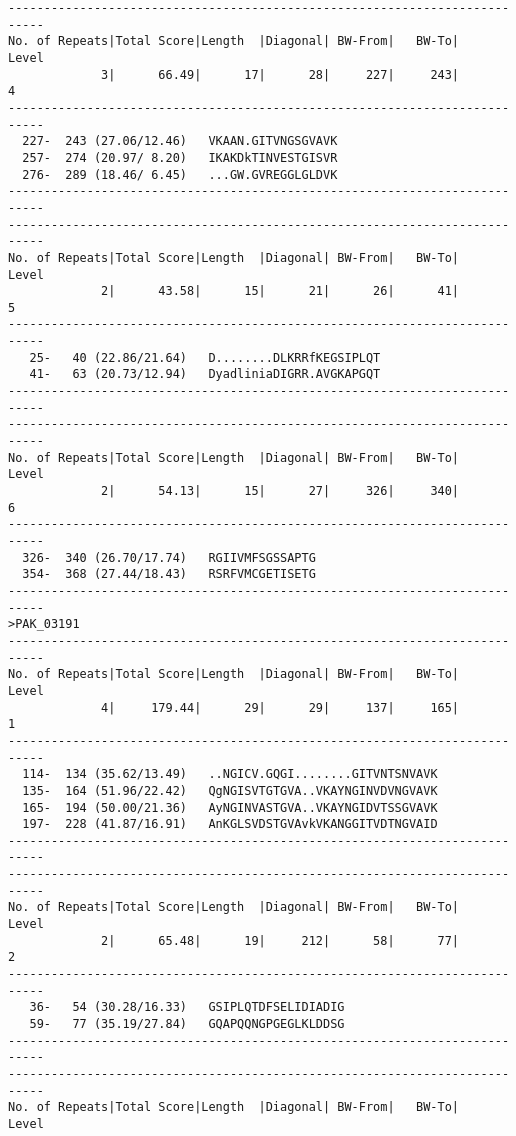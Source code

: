 \begin{verbatim}
---------------------------------------------------------------------------
No. of Repeats|Total Score|Length  |Diagonal| BW-From|   BW-To|   Level
             3|      66.49|      17|      28|     227|     243|       4
---------------------------------------------------------------------------
  227-  243 (27.06/12.46)	VKAAN.GITVNGSGVAVK
  257-  274 (20.97/ 8.20)	IKAKDkTINVESTGISVR
  276-  289 (18.46/ 6.45)	...GW.GVREGGLGLDVK
---------------------------------------------------------------------------
---------------------------------------------------------------------------
No. of Repeats|Total Score|Length  |Diagonal| BW-From|   BW-To|   Level
             2|      43.58|      15|      21|      26|      41|       5
---------------------------------------------------------------------------
   25-   40 (22.86/21.64)	D........DLKRRfKEGSIPLQT
   41-   63 (20.73/12.94)	DyadliniaDIGRR.AVGKAPGQT
---------------------------------------------------------------------------
---------------------------------------------------------------------------
No. of Repeats|Total Score|Length  |Diagonal| BW-From|   BW-To|   Level
             2|      54.13|      15|      27|     326|     340|       6
---------------------------------------------------------------------------
  326-  340 (26.70/17.74)	RGIIVMFSGSSAPTG
  354-  368 (27.44/18.43)	RSRFVMCGETISETG
---------------------------------------------------------------------------
>PAK_03191
---------------------------------------------------------------------------
No. of Repeats|Total Score|Length  |Diagonal| BW-From|   BW-To|   Level
             4|     179.44|      29|      29|     137|     165|       1
---------------------------------------------------------------------------
  114-  134 (35.62/13.49)	..NGICV.GQGI........GITVNTSNVAVK
  135-  164 (51.96/22.42)	QgNGISVTGTGVA..VKAYNGINVDVNGVAVK
  165-  194 (50.00/21.36)	AyNGINVASTGVA..VKAYNGIDVTSSGVAVK
  197-  228 (41.87/16.91)	AnKGLSVDSTGVAvkVKANGGITVDTNGVAID
---------------------------------------------------------------------------
---------------------------------------------------------------------------
No. of Repeats|Total Score|Length  |Diagonal| BW-From|   BW-To|   Level
             2|      65.48|      19|     212|      58|      77|       2
---------------------------------------------------------------------------
   36-   54 (30.28/16.33)	GSIPLQTDFSELIDIADIG
   59-   77 (35.19/27.84)	GQAPQQNGPGEGLKLDDSG
---------------------------------------------------------------------------
---------------------------------------------------------------------------
No. of Repeats|Total Score|Length  |Diagonal| BW-From|   BW-To|   Level

\end{verbatim}
